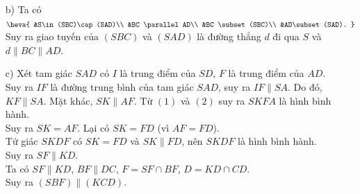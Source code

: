 \begin{ex}
{\begin{enumerate}
			Tứ giác $EICB$ là hình bình hành, nên $CI\parallel  BE$.\\
			 Mặt khác, $BE\subset (BEF)$ suy ra $CI\parallel (BEF)$.
			\item[b)] Ta  có
			 $\heva{
			 &S\in (SBC)\cap (SAD)\\
			 &BC \parallel AD\\
			&BC  \subset (SBC)\\
			&AD\subset (SAD). 
			 }$\\
			Suy ra giao tuyến của $(SBC)$ và $(SAD)$ là đường thẳng $d$ đi qua $S$ và $d\parallel BC\parallel AD$. 
			\item[c)] Xét tam giác  $SAD$ có $I$ là trung điểm của $SD$, $F$ là trung điểm của $AD$.\\
			Suy ra $IF$ là đường trung bình của tam giác $SAD$, suy ra $IF\parallel  SA$. Do đó, $KF \parallel SA$. 
			Mặt khác, $SK \parallel  AF$. 
			Từ $(1)$ và $(2)$ suy ra $SKFA$ là hình  bình hành.\\
			Suy ra $SK=AF$. Lại có $SK=FD$ (vì $AF = FD$).\\ 
			Tứ giác  $SKDF$ có $SK=FD$ và $SK\parallel FD$, nên $SKDF$ là hình bình hành.\\
			Suy ra $SF \parallel  KD$.\\
			Ta có $SF \parallel KD$,  $BF \parallel DC$, $F = SF \cap BF$, $D = KD \cap CD$.\\
			Suy ra $(SBF) \parallel (KCD)$. 
		\end{enumerate}
	 }
\end{ex}

